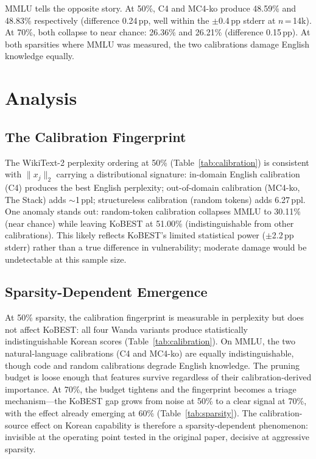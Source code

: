 \documentclass{article}
\begin{document}
MMLU tells the opposite story.
At 50\%, C4 and MC4-ko produce 48.59\% and 48.83\% respectively (difference 0.24\,pp, well within the $\pm$0.4\,pp stderr at $n$\,=\,14k).
At 70\%, both collapse to near chance: 26.36\% and 26.21\% (difference 0.15\,pp).
At both sparsities where MMLU was measured, the two calibrations damage English knowledge equally.

\section{Analysis}
\label{sec:analysis}

\subsection{The Calibration Fingerprint}

The WikiText-2 perplexity ordering at 50\% (Table~\ref{tab:calibration}) is consistent with $\|x_j\|_2$ carrying a distributional signature: in-domain English calibration (C4) produces the best English perplexity; out-of-domain calibration (MC4-ko, The Stack) adds ${\sim}$1\,ppl; structureless calibration (random tokens) adds 6.27\,ppl.
One anomaly stands out: random-token calibration collapses MMLU to 30.11\% (near chance) while leaving KoBEST at 51.00\% (indistinguishable from other calibrations).
This likely reflects KoBEST's limited statistical power ($\pm$2.2\,pp stderr) rather than a true difference in vulnerability; moderate damage would be undetectable at this sample size.

\subsection{Sparsity-Dependent Emergence}

At 50\% sparsity, the calibration fingerprint is measurable in perplexity but does not affect KoBEST: all four Wanda variants produce statistically indistinguishable Korean scores (Table~\ref{tab:calibration}).
On MMLU, the two natural-language calibrations (C4 and MC4-ko) are equally indistinguishable, though code and random calibrations degrade English knowledge.
The pruning budget is loose enough that features survive regardless of their calibration-derived importance.
At 70\%, the budget tightens and the fingerprint becomes a triage mechanism---the KoBEST gap grows from noise at 50\% to a clear signal at 70\%, with the effect already emerging at 60\% (Table~\ref{tab:sparsity}).
The calibration-source effect on Korean capability is therefore a sparsity-dependent phenomenon: invisible at the operating point tested in the original paper, decisive at aggressive sparsity.
\end{document}

